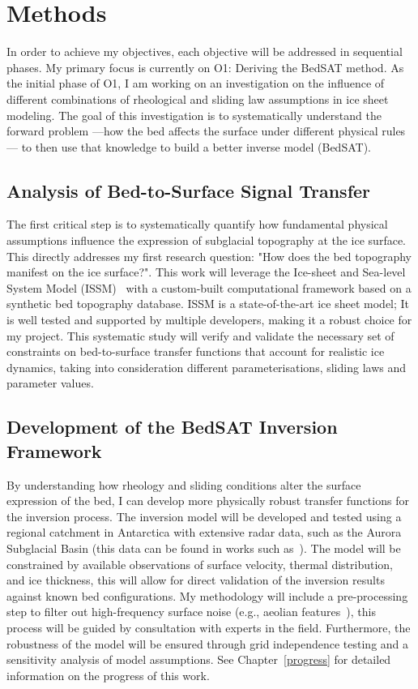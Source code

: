 \chapter{Methods}

In order to achieve my objectives, each objective will be addressed in sequential phases. My primary focus is currently on O1: Deriving the BedSAT method. As the initial phase of O1, I am working on an investigation on the influence of different combinations of rheological and sliding law assumptions in ice sheet modeling. The goal of this investigation is to systematically understand the forward problem —how the bed affects the surface under different physical rules— to then use that knowledge to build a better inverse model (BedSAT).

\section{Analysis of Bed-to-Surface Signal Transfer}\label{paper1}
The first critical step is to systematically quantify how fundamental physical assumptions influence the expression of subglacial topography at the ice surface.
This directly addresses my first research question: "How does the bed topography manifest on the ice surface?". This work will leverage the Ice-sheet and Sea-level System Model (ISSM)~\cite{Larour_2012} with a custom-built computational framework based on a synthetic bed topography database. ISSM is a state-of-the-art ice sheet model; It is well tested and supported by multiple developers, making it a robust choice for my project. This systematic study will verify and validate the necessary set of constraints on bed-to-surface transfer functions that account for realistic ice dynamics, taking into consideration different parameterisations, sliding laws and parameter values.

\section{Development of the BedSAT Inversion Framework}
By understanding how rheology and sliding conditions alter the surface expression of the bed, I can develop more physically robust transfer functions for the inversion process. The inversion model will be developed and tested using a regional catchment in Antarctica with extensive radar data, such as the Aurora Subglacial Basin (this data can be found in works such as~\cite{Young_2011}). The model will be constrained by available observations of surface velocity, thermal distribution, and ice thickness, this will allow for direct validation of the inversion results against known bed configurations. My methodology will include a pre-processing step to filter out high-frequency surface noise (e.g., aeolian features~\cite{Poizat_2024}), this process will be guided by consultation with experts in the field. Furthermore, the robustness of the model will be ensured through grid independence testing and a sensitivity analysis of model assumptions. See Chapter~\ref{progress} for detailed information on the progress of this work.

